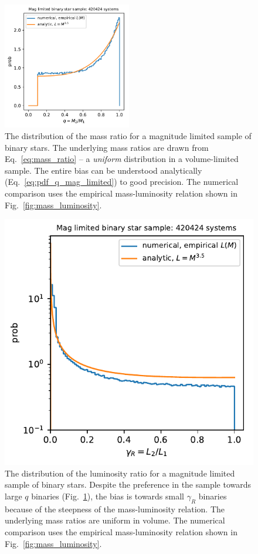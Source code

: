 \documentclass{emulateapj}
\begin{document}
\begin{figure}[!t]
	\begin{center}
		\includegraphics[width=0.5\textwidth]{figures/q_distribn_mag_limited.pdf}
	\end{center}
	\caption{The distribution of the mass ratio for a magnitude limited 
		sample of binary stars. The underlying mass ratios are drawn from 
		Eq.~\ref{eq:mass_ratio} -- a \textit{uniform} distribution in a 
		volume-limited sample.
		The entire bias can be understood analytically 
		(Eq.~\ref{eq:pdf_q_mag_limited}) to good precision. 
        The numerical comparison uses the empirical mass-luminosity relation 
        shown in Fig.~\ref{fig:mass_luminosity}.
	}
	\label{fig:q_distribn_mag_limited}
\end{figure}

\begin{figure}[!t]
	\begin{center}
		\includegraphics[width=.5\textwidth]{figures/gammaR_distribn_mag_limited.pdf}
	\end{center}
	\caption{The distribution of the luminosity ratio for a magnitude limited 
		sample of binary stars. Despite the preference in the sample towards 
		large $q$ binaries (Fig.~\protect\ref{fig:q_distribn_mag_limited}), 
		the bias is towards small $\gamma_R$ binaries because of the steepness 
		of the mass-luminosity relation.
        The underlying mass ratios are uniform in volume.
        The numerical comparison uses the empirical mass-luminosity relation 
        shown in Fig.~\ref{fig:mass_luminosity}.       
    }
	\label{fig:gammaR_distribn_mag_limited}
\end{figure}
\end{document}
